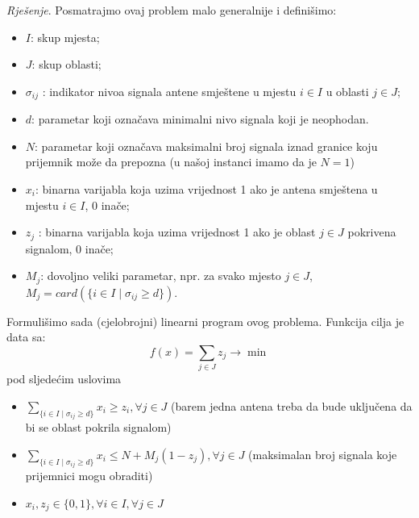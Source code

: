 \documentclass[a4paper, utf8, 11pt, colorlinks]{article}
\begin{document}
\emph{Rješenje}. Posmatrajmo ovaj problem malo generalnije i definišimo: 
\begin{itemize}
    \item $I$: skup mjesta;
    \item $J$: skup oblasti;
    \item $\sigma_{ij}$ : indikator nivoa signala antene   smještene u mjestu $i \in I$ u oblasti $j \in J$;
    \item $d$: parametar koji označava minimalni nivo signala koji je neophodan. 
    \item $N$: parametar koji označava maksimalni broj signala iznad granice koju prijemnik može da prepozna (u našoj instanci imamo da je $N=1$)  
    \item $x_i$: binarna varijabla koja uzima vrijednost 1 ako je antena smještena u mjestu $i\in I$, 0 inače;
    \item  $z_j$ : binarna varijabla koja uzima vrijednost 1 ako je oblast $j \in J$ pokrivena signalom, 0 inače;
    \item $M_j$: dovoljno veliki parametar, npr. za svako mjesto $j \in J$, $M_j= card(\{ i \in I \mid \sigma_{ij} \geq d\})$.
 \end{itemize}
Formulišimo sada (cjelobrojni) linearni program ovog problema. 
Funkcija cilja je data sa:
$$ f(x) = \sum_{j \in J} z_j \rightarrow \min $$
pod sljedećim uslovima 
\begin{itemize}
    \item  $ \sum_{\{i \in I \mid \sigma_{ij} \geq d \}} x_i \geq z_i, \forall j \in J $ (barem jedna antena treba da bude uključena da bi se oblast pokrila signalom)
    \item $ \sum_{\{i \in I \mid \sigma_{ij} \geq d \}} x_i  \leq N + M_j( 1 - z_j), \forall j \in J $ (maksimalan broj signala koje prijemnici mogu obraditi)  
    \item $x_i, z_j \in\{0, 1\}, \forall i \in I, \forall j \in J$
\end{itemize}
\end{document}
